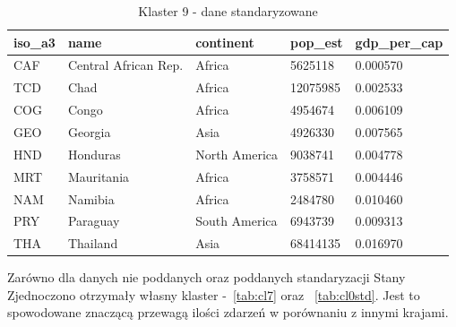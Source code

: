 \documentclass[11pt]{report}
\begin{document}
    \begin{table}[h!]
        \caption {Klaster 9 - dane standaryzowane} \label{tab:cl9std}
        \begin{tabular}{lllll}
            \hline
            \multicolumn{1}{|l|}{iso\_a3} & \multicolumn{1}{l|}{name} & \multicolumn{1}{l|}{continent} & \multicolumn{1}{l|}{pop\_est} & \multicolumn{1}{l|}{gdp\_per\_cap} \\ \hline
            CAF                           & Central African Rep.      & Africa                         & 5625118                       & 0.000570                           \\
            TCD                           & Chad                      & Africa                         & 12075985                      & 0.002533                           \\
            COG                           & Congo                     & Africa                         & 4954674                       & 0.006109                           \\
            GEO                           & Georgia                   & Asia                           & 4926330                       & 0.007565                           \\
            HND                           & Honduras                  & North America                  & 9038741                       & 0.004778                           \\
            MRT                           & Mauritania                & Africa                         & 3758571                       & 0.004446                           \\
            NAM                           & Namibia                   & Africa                         & 2484780                       & 0.010460                           \\
            PRY                           & Paraguay                  & South America                  & 6943739                       & 0.009313                           \\
            THA                           & Thailand                  & Asia                           & 68414135                      & 0.016970
        \end{tabular}
    \end{table}

    Zarówno dla danych nie poddanych oraz poddanych standaryzacji Stany Zjednoczono otrzymały własny klaster -~\ref{tab:cl7} oraz ~\ref{tab:cl0std}.
    Jest to spowodowane znaczącą przewagą ilości zdarzeń w porównaniu z innymi krajami.
\end{document}
